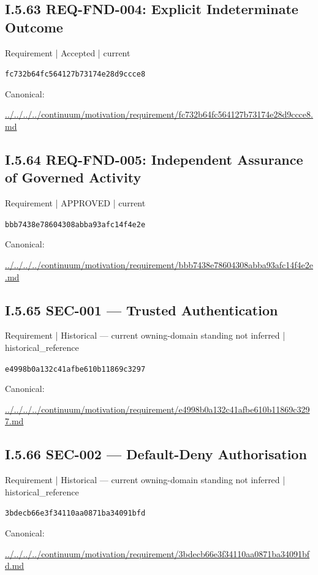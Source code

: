 \documentclass[10pt,a4paper]{article}
\begin{document}
\subsection*{I.5.63 REQ-FND-004: Explicit Indeterminate Outcome}
{\small Requirement | Accepted | current}\par
\texttt{fc732b64fc564127b73174e28d9ccce8}\par
Canonical: \par
{\footnotesize\url{../../../../continuum/motivation/requirement/fc732b64fc564127b73174e28d9ccce8.md}}\par
\subsection*{I.5.64 REQ-FND-005: Independent Assurance of Governed Activity}
{\small Requirement | APPROVED | current}\par
\texttt{bbb7438e78604308abba93afc14f4e2e}\par
Canonical: \par
{\footnotesize\url{../../../../continuum/motivation/requirement/bbb7438e78604308abba93afc14f4e2e.md}}\par
\subsection*{I.5.65 SEC-001 — Trusted Authentication}
{\small Requirement | Historical — current owning-domain standing not inferred | historical\_reference}\par
\texttt{e4998b0a132c41afbe610b11869c3297}\par
Canonical: \par
{\footnotesize\url{../../../../continuum/motivation/requirement/e4998b0a132c41afbe610b11869c3297.md}}\par
\subsection*{I.5.66 SEC-002 — Default-Deny Authorisation}
{\small Requirement | Historical — current owning-domain standing not inferred | historical\_reference}\par
\texttt{3bdecb66e3f34110aa0871ba34091bfd}\par
Canonical: \par
{\footnotesize\url{../../../../continuum/motivation/requirement/3bdecb66e3f34110aa0871ba34091bfd.md}}\par
\end{document}
